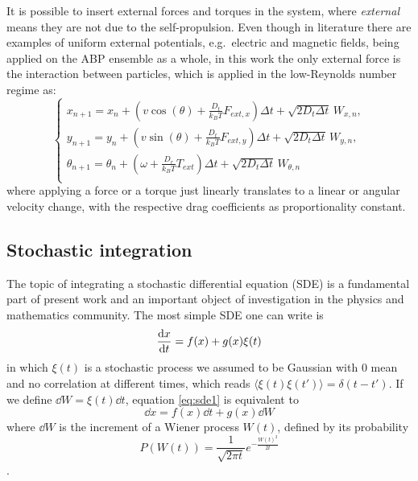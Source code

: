 \documentclass[../../master_thesis_np.tex]{subfiles}
\begin{document}
		It is possible to insert external forces and torques in the system, where \emph{external} means they are not due to the self-propulsion. 
		Even though in literature there are examples of uniform external potentials, e.g.\ electric and magnetic fields, being applied on the ABP ensemble as a whole, in this work the only external force is the interaction between particles, which is applied in the low-Reynolds number regime as:
		\begin{equation} \label{eq:fin_diff_with_forces}
			\begin{cases}
				x_{n+1} = x_n + \left( v \cos(\theta) + \frac{D_t}{k_B T} F_{ext,x} \right) \Delta t + \sqrt{2D_t \Delta t} \, W_{x,n},\\
				y_{n+1} = y_n + \left( v \sin(\theta) + \frac{D_t}{k_B T} F_{ext,y} \right) \Delta t + \sqrt{2D_t \Delta t} \, W_{y,n},\\
				\theta_{n+1} = \theta_n +\left(\omega + \frac{D_r}{k_B T}{}T_{ext}\right) \Delta t + \sqrt{2D_t \Delta t} \, W_{\theta,n}\\
			\end{cases}
		\end{equation}
		where applying a force or a torque just linearly translates to a linear or angular velocity change, with the respective drag coefficients as proportionality constant.
		
		\subsection{Stochastic integration}
		The topic of integrating a stochastic differential equation (SDE) is a fundamental part of present work and an important object of investigation in the physics and mathematics community. 
		The most simple SDE one can write is
		\begin{equation} \label{eq:sde1}
			\dv{x}{t} = f(x) + g(x)\xi(t)
		\end{equation}
		in which $\xi(t)$ is a stochastic process we assumed to be Gaussian with 0 mean and no correlation at different times, which reads $ \langle \xi(t) \xi(t') \rangle = \delta(t-t')$. If we define  $\dd{W} = \xi(t)\dd{t}$, equation \ref{eq:sde1} is equivalent to
		\begin{equation} \label{eq:sde2}
			\dd{x} = f(x)\dd{t} + g(x)\dd{W} 
		\end{equation} 
		where $\dd{W}$ is the increment of a Wiener process $W(t)$, defined by its probability
		\begin{equation} 
			P(W(t)) = \frac{1}{\sqrt{2 \pi t}} e^{-\frac{W(t)^2}{2t}}
		\end{equation}
		.
		
\end{document}
